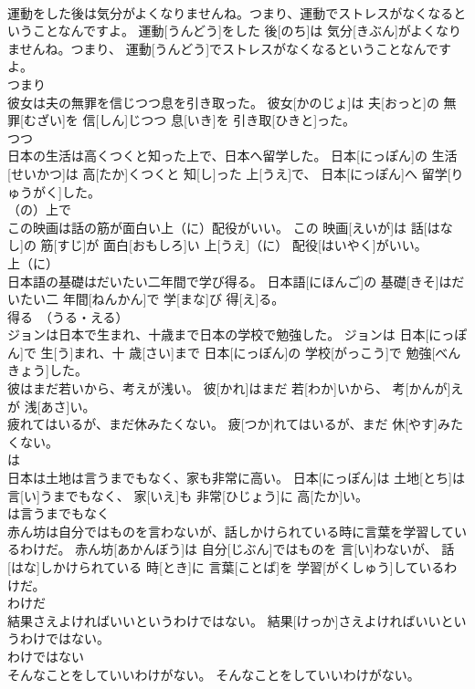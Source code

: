 \documentclass[8pt]{extreport}
\begin{document}
\begin{CJK}{UTF8}{min}
\\	運動をした後は気分がよくなりませんね。つまり、運動でストレスがなくなるということなんですよ。	運動[うんどう]をした 後[のち]は 気分[きぶん]がよくなりませんね。つまり、 運動[うんどう]でストレスがなくなるということなんですよ。	
\\	つまり	
\\	彼女は夫の無罪を信じつつ息を引き取った。	彼女[かのじょ]は 夫[おっと]の 無罪[むざい]を 信[しん]じつつ 息[いき]を 引き取[ひきと]った。	
\\	つつ	
\\	日本の生活は高くつくと知った上で、日本へ留学した。	日本[にっぽん]の 生活[せいかつ]は 高[たか]くつくと 知[し]った 上[うえ]で、 日本[にっぽん]へ 留学[りゅうがく]した。	
\\	（の）上で	
\\	この映画は話の筋が面白い上（に）配役がいい。	この 映画[えいが]は 話[はなし]の 筋[すじ]が 面白[おもしろ]い 上[うえ]（に） 配役[はいやく]がいい。	
\\	上（に）	
\\	日本語の基礎はだいたい二年間で学び得る。	日本語[にほんご]の 基礎[きそ]はだいたい二 年間[ねんかん]で 学[まな]び 得[え]る。	
\\	得る　（うる・える）	
\\	ジョンは日本で生まれ、十歳まで日本の学校で勉強した。	ジョンは 日本[にっぽん]で 生[う]まれ、十 歳[さい]まで 日本[にっぽん]の 学校[がっこう]で 勉強[べんきょう]した。	
\\	彼はまだ若いから、考えが浅い。	彼[かれ]はまだ 若[わか]いから、 考[かんが]えが 浅[あさ]い。	
\\	疲れてはいるが、まだ休みたくない。	疲[つか]れてはいるが、まだ 休[やす]みたくない。	
\\	は	
\\	日本は土地は言うまでもなく、家も非常に高い。	日本[にっぽん]は 土地[とち]は 言[い]うまでもなく、 家[いえ]も 非常[ひじょう]に 高[たか]い。	
\\	は言うまでもなく	
\\	赤ん坊は自分ではものを言わないが、話しかけられている時に言葉を学習しているわけだ。	赤ん坊[あかんぼう]は 自分[じぶん]ではものを 言[い]わないが、 話[はな]しかけられている 時[とき]に 言葉[ことば]を 学習[がくしゅう]しているわけだ。	
\\	わけだ	
\\	結果さえよければいいというわけではない。	結果[けっか]さえよければいいというわけではない。	
\\	わけではない	
\\	そんなことをしていいわけがない。	そんなことをしていいわけがない。	

\end{CJK}
\end{document}
